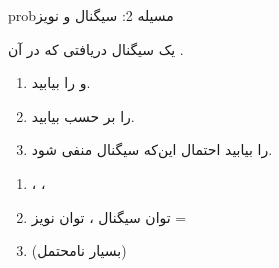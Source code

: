 \begin{PSbox}[unbreakable]{prob}{مسیله 2: سیگنال و نویز}

یک سیگنال دریافتی  که در آن .

\begin{enumerate}
\def\labelenumi{(\PSalph{enumi})}
\tightlist
\item
   و  را بیابید.
\item
   را بر حسب  بیابید.
\item
   را بیابید  احتمال این‌که سیگنال منفی شود.
\end{enumerate}

\PSsolution{} 

\begin{enumerate}
\def\labelenumi{(\PSalph{enumi})}
\item
  ، ، 
\item
  توان سیگنال ، توان نویز = \PSbr{}
\item
   (بسیار نامحتمل)
\end{enumerate}

\end{PSbox}

